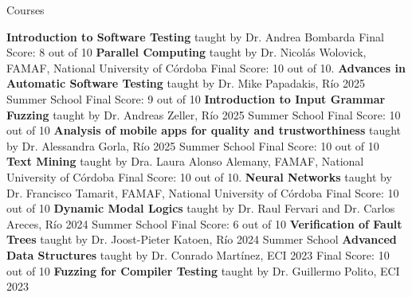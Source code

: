 \begin{rubric}{Courses}

\entry*[May. 2025]
    \textbf{Introduction to Software Testing}
    \newline taught by Dr. Andrea Bombarda
    \newline Final Score: 8 out of 10
\entry*[Apr. 2025]
    \textbf{Parallel Computing}
    \newline taught by Dr. Nicolás Wolovick, FAMAF, National University of Córdoba
    \newline Final Score: 10 out of 10.
\entry*[Mar. 2025] 
    \textbf{Advances in Automatic Software Testing}
    \newline taught by Dr. Mike Papadakis, Río 2025 Summer School
    \newline Final Score: 9 out of 10
\entry*[Mar. 2025] 
    \textbf{Introduction to Input Grammar Fuzzing}
    \newline taught by Dr. Andreas Zeller, Río 2025 Summer School
    \newline Final Score: 10 out of 10
\entry*[Mar. 2025] 
    \textbf{Analysis of mobile apps for quality and trustworthiness}
    \newline taught by Dr. Alessandra Gorla, Río 2025 Summer School
    \newline Final Score: 10 out of 10
\entry*[Aug. 2024]
    \textbf{Text Mining}
    \newline taught by Dra. Laura Alonso Alemany, FAMAF, National University of Córdoba
    \newline Final Score: 10 out of 10.
\entry*[Aug. 2024]
    \textbf{Neural Networks}
    \newline taught by Dr. Francisco Tamarit, FAMAF, National University of Córdoba
    \newline Final Score: 10 out of 10
\entry*[Feb. 2024] 
    \textbf{Dynamic Modal Logics}
    \newline taught by Dr. Raul Fervari and Dr. Carlos Areces, Río 2024 Summer School
    \newline Final Score: 6 out of 10
\entry*[Feb. 2024] 
    \textbf{Verification of Fault Trees}
    \newline taught by Dr. Joost-Pieter Katoen, Río 2024 Summer School
\entry*[Aug. 2023] 
    \textbf{Advanced Data Structures}
    \newline taught by Dr. Conrado Martínez, ECI 2023
    \newline Final Score: 10 out of 10
\entry*[Aug. 2023] 
    \textbf{Fuzzing for Compiler Testing}
    \newline taught by Dr. Guillermo Polito, ECI 2023

\end{rubric}
